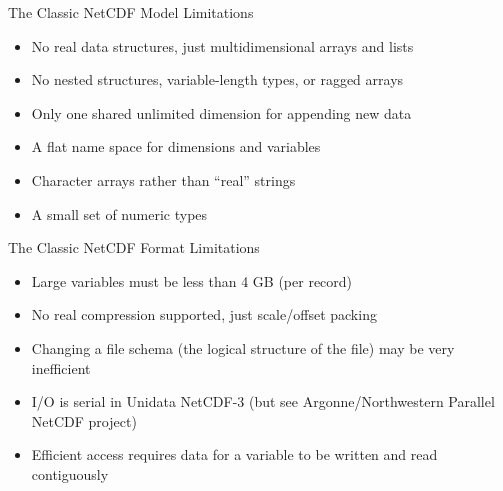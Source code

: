\documentclass[compress,11pt,xcolor=svgnames,aspectratio=169]{beamer}
\begin{document}
\begin{frame}[t]{The Classic NetCDF Model Limitations}

    \begin{itemize}
    \setlength\itemsep{0.4cm}
        \item No real data structures, just multidimensional arrays and lists
        \item No nested structures, variable-length types, or ragged arrays
        \item Only one shared unlimited dimension for appending new data
        \item A flat name space for dimensions and variables
        \item Character arrays rather than ``real'' strings
        \item A small set of numeric types
    \end{itemize}

\nocite{netcdf}

\end{frame}

\begin{frame}[t]{The Classic NetCDF Format Limitations}

    \begin{itemize}
    \setlength\itemsep{0.4cm}
        \item Large variables must be less than 4 GB (per record)
        \item No real compression supported, just scale/offset packing
        \item Changing a file schema (the logical structure of the file) may be very inefficient
        \item I/O is serial in Unidata NetCDF-3 (but see Argonne/Northwestern Parallel NetCDF project)
        \item Efficient access requires data for a variable to be written and read contiguously
    \end{itemize}

\nocite{netcdf}

\end{frame}
\end{document}
